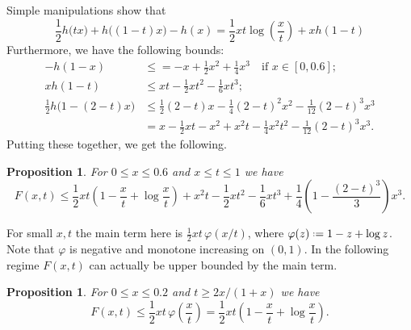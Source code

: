 \documentclass[12pt]{amsart}
\newtheorem{proposition}[theorem]{Proposition}
\theoremstyle{definition}
\newcommand{\defeq}{\mathrel{\vcenter{\baselineskip0.5ex \lineskiplimit0pt
                     \hbox{\scriptsize.}\hbox{\scriptsize.}}}%
                     =}
\begin{document}
Simple manipulations show that 
%
\begin{equation*} 
\frac12 h\big( tx \big) 
+ h\big( (1-t)x \big) 
- h(x) 
= \frac12 xt \log\left(\frac{x}{t}\right) + x h(1-t)
\end{equation*}
%
Furthermore, we have the following bounds:
%
\begin{align*}
-h(1-x) & \leq = - x + \frac12 x^2 + \frac14 x^3 
\quad \text{if } x \in [0,0.6] ;\\
x h(1-t) & \leq xt - \frac12 xt^2 - \frac16 xt^3 ;\\
\frac12 h\big( 1-(2-t)x \big) & \leq 
\frac 12 (2-t)x - \frac14 (2-t)^2x^2 - \frac{1}{12}(2-t)^3 x^3 \\ 
&= x-\frac12 xt - x^2 + x^2t - \frac14 x^2t^2 - \frac{1}{12}(2-t)^3 x^3 .
\end{align*}
%
Putting these together, we get the following.
%
\begin{proposition} \label{prop:F_estimate}
For $0 \leq x \leq 0.6$ and $x \leq t \leq 1$ we have 
%
\begin{equation*} 
F(x,t) \leq 
\frac12 xt \left( 1-\frac{x}{t} + \log\frac{x}{t} \right) 
+ x^2t -\frac12xt^2 - \frac16 xt^3 
+ \frac14 \left( 1- \frac{(2-t)^3}{3} \right)x^3 . 
\end{equation*}
%
\end{proposition}
%
For small $x,t$ the main term here is $\frac12 xt \,\varphi(x/t)$, where $\varphi(z) \defeq 1-z+\log z$. Note that $\varphi$ is negative and monotone increasing on $(0,1)$.
%
In the following regime $F(x,t)$ can actually be upper bounded by the main term.
%
\begin{proposition} \label{prop:F_main_term}
For $0 \leq x \leq 0.2$ and $t \geq 2x/(1+x)$ we have 
%
\begin{equation*} 
F(x,t) 
\leq \frac12 xt \, \varphi\left( \frac{x}{t} \right)
= \frac12 xt \left( 1-\frac{x}{t} + \log\frac{x}{t} \right) .
\end{equation*}
%
\end{proposition}
%
\end{document}
